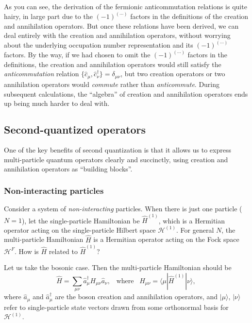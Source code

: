 \documentclass[prx,12pt]{revtex4-2}
\begin{document}
As you can see, the derivation of the fermionic anticommutation
relations is quite hairy, in large part due to the $(-1)^{(\cdots)}$
factors in the definitions of the creation and annihilation operators.
But once these relations have been derived, we can deal entirely with
the creation and annihilation operators, without worrying about the
underlying occupation number representation and its $(-1)^{(\cdots)}$
factors.  By the way, if we had chosen to omit the $(-1)^{(\cdots)}$
factors in the definitions, the creation and annihilation operators
would still satisfy the \textit{anticommutation} relation
$\{\hat{c}_\mu,\hat{c}_\nu^\dagger\}=\delta_{\mu\nu}$, but two
creation operators or two annihilation operators would
\textit{commute} rather than \textit{anticommute}.  During subsequent
calculations, the ``algebra'' of creation and annihilation operators
ends up being much harder to deal with.

\subsection{Second-quantized operators}
\label{sec:second_quant_op}

One of the key benefits of second quantization is that it allows us to
express multi-particle quantum operators clearly and succinctly, using
creation and annihilation operators as ``building blocks''.

\subsubsection{Non-interacting particles}

Consider a system of \textit{non-interacting} particles.  When there
is just one particle ($N=1$), let the single-particle Hamiltonian be
$\hat{H}^{(1)}$, which is a Hermitian operator acting on the
single-particle Hilbert space $\mathscr{H}^{(1)}$.  For general $N$,
the multi-particle Hamiltonian $\hat{H}$ is a Hermitian operator
acting on the Fock space $\mathscr{H}^F$.  How is $\hat{H}$ related to
$\hat{H}^{(1)}$?

Let us take the bosonic case.  Then the multi-particle Hamiltonian
should be
\begin{equation}
  \hat{H} = \sum_{\mu\nu} \hat{a}^\dagger_\mu H_{\mu\nu} \hat{a}_\nu,
  \;\;\; \mathrm{where}\;\;\;
  H_{\mu\nu} = \langle\mu|\hat{H}^{(1)}|\nu\rangle,
  \label{twobosonH}
\end{equation}
where $\hat{a}_\mu$ and $\hat{a}_\mu^\dagger$ are the boson creation
and annihilation operators, and $|\mu\rangle$, $|\nu\rangle$ refer to
single-particle state vectors drawn from some orthonormal basis for
$\mathscr{H}^{(1)}$.
\end{document}
